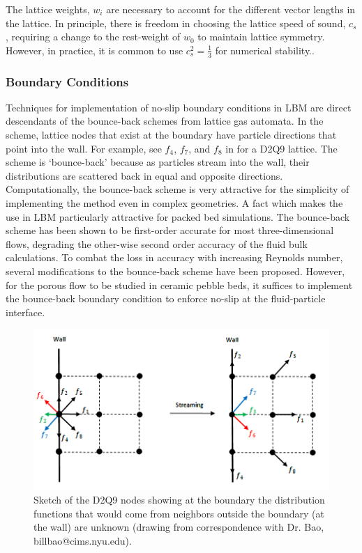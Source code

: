 The lattice weights, $w_i$ are necessary to account for the different vector lengths in the lattice. In principle, there is freedom in choosing the lattice speed of sound, $c_s$, requiring a change to the rest-weight of $w_0$ to maintain lattice symmetry. However, in practice, it is common to use $c_s^2 = \frac{1}{3}$ for numerical stability.\cite{Latt2007,succi2001lattice}.




\subsubsection{Boundary Conditions}
Techniques for implementation of no-slip boundary conditions in LBM are direct descendants of the bounce-back schemes from lattice gas automata. In the scheme, lattice nodes that exist at the boundary have particle directions that point into the wall. For example, see $f_4$, $f_7$, and $f_8$ in  for a D2Q9 lattice. The scheme is `bounce-back' because as particles stream into the wall, their distributions are scattered back in equal and opposite directions. Computationally, the bounce-back scheme is very attractive for the simplicity of implementing the method even in complex geometries. A fact which makes the use in LBM particularly attractive for packed bed simulations.\cite{Chen1998a} The bounce-back scheme has been shown to be first-order accurate for most three-dimensional flows, degrading the other-wise second order accuracy of the fluid bulk calculations.\cite{Zou1997,Chen1998a} To combat the loss in accuracy with increasing Reynolds number, several modifications to the bounce-back scheme have been proposed.\cite{Chen1998a} However, for the porous flow to be studied in ceramic pebble beds, it suffices to implement the bounce-back boundary condition to enforce no-slip at the fluid-particle interface.\cite{Chen1998a,Luo2003a}

\begin{figure}[t]
	\centering
	\includegraphics[width=\singleimagewidth]{figures/lbm/ongrid}
	\caption{Sketch of the D2Q9 nodes showing at the boundary the distribution functions that would come from neighbors outside the boundary (at the wall) are unknown (drawing from correspondence with Dr. Bao, billbao@cims.nyu.edu).}\label{fig:wall-lattice-bc}
\end{figure}


